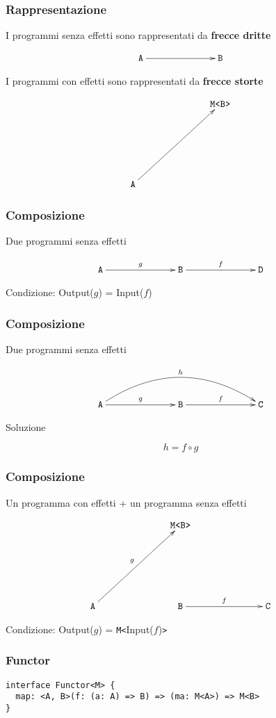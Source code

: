 \documentclass{beamer}
\begin{document}
\begin{frame}
\frametitle{Rappresentazione}

I programmi senza effetti sono rappresentati da \textbf{frecce dritte}

\[
\xymatrixrowsep{2.5cm}
\xymatrixcolsep{2.5cm}
\xymatrix{
  \texttt{A} \ar[r] & \texttt{B}
}
\]

I programmi con effetti sono rappresentati da \textbf{frecce storte}

\[
\xymatrixrowsep{2.5cm}
\xymatrixcolsep{2.5cm}
\xymatrix{
  & \texttt{M<B>} \\
  \texttt{A} \ar[ur]
}
\]

\end{frame}

\begin{frame}
\frametitle{Composizione}

Due programmi senza effetti

\[
\xymatrixrowsep{2.5cm}
\xymatrixcolsep{2.5cm}
\xymatrix{
  \texttt{A} \ar[r]^{g} & \texttt{B} \ar[r]^{f} & \texttt{D}
}
\]

Condizione: Output($g$) = Input($f$)

\end{frame}

\begin{frame}
\frametitle{Composizione}

Due programmi senza effetti

\[
\xymatrixrowsep{2.5cm}
\xymatrixcolsep{2.5cm}
\xymatrix{
  \texttt{A} \ar[r]^{g} \ar@/^1cm/[rr]^{h} & \texttt{B} \ar[r]^{f} & \texttt{C}
}
\]

Soluzione

$$
h = f \circ g
$$

\end{frame}

\begin{frame}
\frametitle{Composizione}

Un programma con effetti + un programma senza effetti

\[
\xymatrixrowsep{2.5cm}
\xymatrixcolsep{2.5cm}
\xymatrix{
  & \texttt{M<B>} \\
  \texttt{A} \ar[ur]^{g} & \texttt{B} \ar[r]^{f} & \texttt{C}
}
\]

Condizione: Output($g$) = \texttt{M<}Input($f$)\texttt{>}

\end{frame}

\begin{frame}[fragile]
\frametitle{Functor}

\begin{verbatim}
interface Functor<M> {
  map: <A, B>(f: (a: A) => B) => (ma: M<A>) => M<B>
}
\end{verbatim}

\end{frame}
\end{document}
